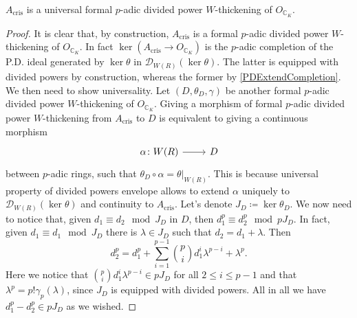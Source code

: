 \begin{prop}\label{UPACris}
	$A_{\mathrm{cris}}$ is a universal formal $p$-adic divided power $W$-thickening of
	$O_{\mathbb{C}_K}$.
\end{prop}
\begin{proof}
	It is clear that, by construction, $A_{\mathrm{cris}}$ is a
	formal $p$-adic divided power $W$-thickening of $O_{\mathbb{C}_K}$.
	In fact $\ker (A_{\mathrm{cris}} \to O_{\mathbb{C}_K})$
	is the $p$-adic completion of the P.D. ideal generated by $\ker \theta$
	in $\mathcal{D}_{W(R)}(\ker\theta)$.
	The latter is equipped with divided powers by construction, whereas
	the former by \cref{PDExtendCompletion}.
	We then need to show universality.
	Let $\left(D, \theta_D, \gamma\right)$ be another formal $p$-adic divided power
	$W$-thickening of $O_{\mathbb{C}_K}$.
	Giving a morphism of formal $p$-adic divided power $W$-thickening
	from $A_{\mathrm{cris}}$ to $D$ is equivalent to giving
	a continuous morphism
	\begin{equation*}
	\begin{tikzcd}[row sep = 0ex
		,/tikz/column 1/.append style={anchor=base east}
		,/tikz/column 2/.append style={anchor=base west}]
		\alpha\colon W(R) \arrow[r, "", rightarrow] &
		D
	\end{tikzcd}
	\end{equation*} 
	between $p$-adic rings, such that $\theta_D \circ \alpha = \left.\theta\right|_{ W(R) }$.
	This is because universal property of divided powers envelope
	allows to extend $\alpha$ uniquely to $\mathcal{D}_{W(R)}(\ker\theta)$
	and continuity to $A_{\mathrm{cris}}$.
	Let's denote $J_D \coloneqq \ker\theta_D$.
	We now need to notice that, given $d_1 \equiv d_2 \mod J_D$ in $D$,
	then $d_1^p \equiv d_2^p \mod pJ_D$.
	In fact, given $d_1 \equiv d_1 \mod J_D$ there is $\lambda \in J_D$
	such that $d_2 = d_1 + \lambda$.
	Then
	\begin{equation*}
		d_2^p = d_1^p + \sum_{i=1}^{ p-1 } \binom{p}{i} d_1^i \lambda^{p-i} + \lambda^p
	.\end{equation*}
	Here we notice that $\binom{p}{i} d_1^i \lambda^{p-i} \in pJ_D$ for all $2 \leq i \leq p-1$
	and that $\lambda^p = p! \gamma_p(\lambda)$, since $J_D$ is equipped with divided
	powers.
	All in all we have $d_1^p - d_2^p \in pJ_D$ as we wished.

\end{proof}
